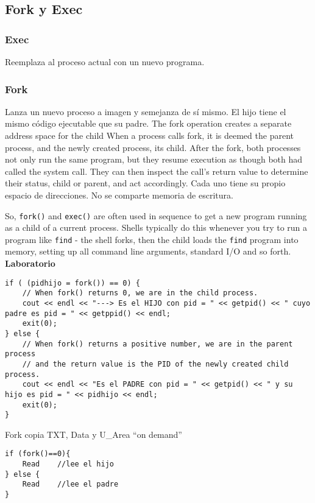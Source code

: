 \documentclass[a4paper, twoside]{article}
\begin{document}
\subsection{Fork y Exec}
\subsubsection{Exec}
Reemplaza al proceso actual con un nuevo programa.

\subsubsection{Fork}
Lanza un nuevo proceso a imagen y semejanza de sí mismo. El hijo tiene el mismo código ejecutable que su padre.
The fork operation creates a separate address space for the child
When a process calls fork, it is deemed the parent process, and the newly created process, its child. After the fork, both processes not only run the same program, but they resume execution as though both had called the system call. They can then inspect the call's return value to determine their status, child or parent, and act accordingly.
Cada uno tiene su propio espacio de direcciones. No se comparte memoria de escritura.

So, \texttt{fork()} and \texttt{exec()} are often used in sequence to get a new program running as a child of a current process. Shells typically do this whenever you try to run a program like \texttt{find} - the shell forks, then the child loads the \texttt{find} program into memory, setting up all command line arguments, standard I/O and so forth.\\

\textbf{Laboratorio}

\begin{lstlisting}
if ( (pidhijo = fork()) == 0) {
	// When fork() returns 0, we are in the child process.
	cout << endl << "---> Es el HIJO con pid = " << getpid() << " cuyo padre es pid = " << getppid() << endl;
	exit(0);
} else {
	// When fork() returns a positive number, we are in the parent process
	// and the return value is the PID of the newly created child process.
	cout << endl << "Es el PADRE con pid = " << getpid() << " y su hijo es pid = " << pidhijo << endl;
	exit(0);
}
\end{lstlisting}

Fork copia TXT, Data y U\_Area “on demand”

\begin{lstlisting}
if (fork()==0){
	Read	//lee el hijo
} else {
	Read	//lee el padre
}
\end{lstlisting}
\end{document}
